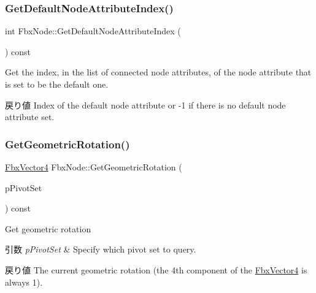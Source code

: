 \mbox{\label{class_fbx_node_adbeba237f641a5448b14a32e41f18cd9}} 
\subsubsection{\texorpdfstring{Get\+Default\+Node\+Attribute\+Index()}{GetDefaultNodeAttributeIndex()}}
{\footnotesize\ttfamily int Fbx\+Node\+::\+Get\+Default\+Node\+Attribute\+Index (\begin{DoxyParamCaption}{ }\end{DoxyParamCaption}) const}

Get the index, in the list of connected node attributes, of the node attribute that is set to be the default one. \begin{DoxyReturn}{戻り値}
Index of the default node attribute or {\ttfamily -\/1} if there is no default node attribute set. 
\end{DoxyReturn}
\mbox{\label{class_fbx_node_a36fc6c0ae9d18e3b492f7b87d6146cea}} 
\subsubsection{\texorpdfstring{Get\+Geometric\+Rotation()}{GetGeometricRotation()}}
{\footnotesize\ttfamily \hyperlink{class_fbx_vector4}{Fbx\+Vector4} Fbx\+Node\+::\+Get\+Geometric\+Rotation (\begin{DoxyParamCaption}\item[{\hyperlink{class_fbx_node_ae62b7311ac4727654cdf1ebd5cbf7343}{E\+Pivot\+Set}}]{p\+Pivot\+Set }\end{DoxyParamCaption}) const}

Get geometric rotation 
\begin{DoxyParams}{引数}
{\em p\+Pivot\+Set} & Specify which pivot set to query. \\
\hline
\end{DoxyParams}
\begin{DoxyReturn}{戻り値}
The current geometric rotation (the 4th component of the \hyperlink{class_fbx_vector4}{Fbx\+Vector4} is always 1). 
\end{DoxyReturn}
\mbox{\label{class_fbx_node_acb9a52f8757948a3128d6813654bc99a}} 
